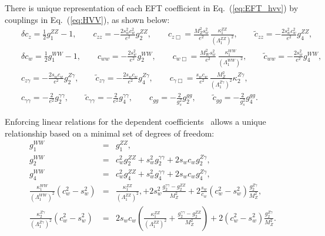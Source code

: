 \documentclass[aps,superscriptaddress,nofootinbib]{revtex4}
\begin{document}
There is unique representation of each EFT coefficient in Eq.~(\ref{eq:EFT_hvv}) by couplings in Eq.~(\ref{eq:HVV}),
as shown below:
\begin{eqnarray}  &&
\label{eq:EFT_ci}
    \delta c_z  = \frac12 g_1^{ZZ} - 1,
    \quad\quad
    c_{zz} = -\frac{2 s_w^2 c_w^2}{e^2} g_2^{ZZ},
    \quad\quad
    c_{z \Box} = \frac{M_Z^2 s_w^2}{e^2} \, \frac{\kappa_1^{ZZ}}{(\Lambda_1^{ZZ})^2},
    \quad\quad
    \tilde c_{zz} = -\frac{2 s_w^2 c_w^2}{e^2} g_4^{ZZ},
    \nonumber \\ &&
     \delta c_w = \frac12 g_1^{WW} - 1,
    \quad\quad
    c_{ww} = -\frac{2 s_w^2 }{e^2} g_2^{WW},
    \quad\quad
    c_{w \Box} = \frac{M_W^2 s_w^2}{e^2} \, \frac{\kappa_1^{WW}}{(\Lambda_1^{WW})^2},
    \quad\quad
    \tilde c_{ww} = -\frac{2 s_w^2}{e^2} g_4^{WW},
    \nonumber\\ &&
     c_{z \gamma} = -\frac{2 s_w c_w}{e^2} g_2^{Z\gamma},
    \quad\quad
    \tilde c_{z \gamma} = -\frac{2 s_w c_w}{e^2} g_4^{Z\gamma},
    \quad\quad
    c_{\gamma \Box} = \frac{s_w c_w}{e^2} \, \frac{M_Z^2}{(\Lambda_1^{Z\gamma})^2} \kappa_2^{Z\gamma},
   \nonumber\\ &&
     c_{\gamma \gamma} = -\frac{2}{e^2} g_2^{\gamma\gamma},   
    \quad\quad
   \tilde c_{\gamma \gamma} = -\frac{2}{e^2} g_4^{\gamma\gamma},
    \quad\quad
     c_{gg} = -\frac{2}{g_s^2} g_2^{gg},
   \quad\quad
   \tilde c_{gg} = -\frac{2}{g_s^2} g_4^{gg}.
\end{eqnarray} 

Enforcing linear relations for the dependent coefficients~\cite{deFlorian:2016spz} allows a unique relationship based on a minimal set of degrees of freedom:
\begin{eqnarray}
  g_1^{WW} &=& g_1^{ZZ} 
  ,    
  \label{eq:deltaMW}
  \\
  g_2^{WW} &=& c_w^2 g_2^{ZZ} + s_w^2 g_2^{\gamma\gamma} + 2 s_w c_w g_2^{Z\gamma},
  \label{eq:g2WW}
  \\
  g_4^{WW} &=& c_w^2 g_4^{ZZ} + s_w^2 g_4^{\gamma\gamma} + 2 s_w c_w g_4^{Z\gamma},
  \label{eq:g4WW}
  \\
  \frac{\kappa_1^{WW}}{(\Lambda_1^{WW})^2} (c_w^2-s_w^2) &=& \frac{\kappa_1^{ZZ}}{(\Lambda_1^{ZZ})^2},
                                                           +2 s_w^2 \frac{g_2^{\gamma\gamma}-g_2^{ZZ}}{M_Z^2} 
                                                          +2 \frac{s_w}{c_w} (c_w^2-s_w^2) \frac{g_2^{Z\gamma}}{M_Z^2},
 \label{eq:kappa1WW}
  \\
  \frac{\kappa_2^{Z\gamma}}{(\Lambda_1^{Z\gamma})^2} (c_w^2-s_w^2) &=&  2 s_w c_w \left( \frac{\kappa_1^{ZZ}}{(\Lambda_1^{ZZ})^2} 
                                                                              + \frac{ g_2^{\gamma\gamma} - g_2^{ZZ}}{M_Z^2}  \right)
                                                                               +2 (c_w^2-s_w^2) \frac{g_2^{Z\gamma}}{M_Z^2}.
 \label{eq:kappa2Zgamma}
 \end{eqnarray}
\end{document}
